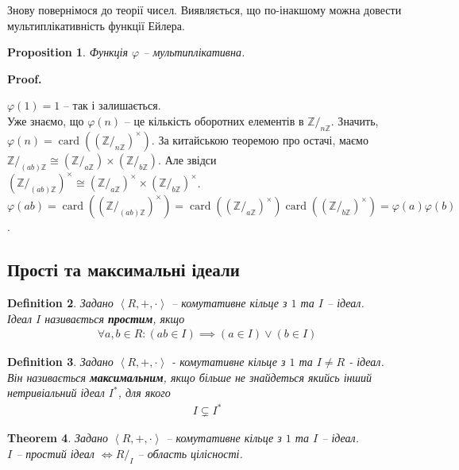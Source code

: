 \documentclass[a4paper, 10pt]{article}
\makeatletter
\theoremstyle{theoremdd}
\newtheorem{theorem}{Theorem}[subsection]
\theoremstyle{theoremdd}
\newtheorem{definition}[theorem]{Definition}
\theoremstyle{theoremdd}
\theoremstyle{theoremdd}
\theoremstyle{theoremdd}
\theoremstyle{theoremdd}
\theoremstyle{theoremdd}
\theoremstyle{theoremdd}
\theoremstyle{theoremdd}
\newtheorem{proposition}[theorem]{Proposition}
\theoremstyle{theoremdd}
\theoremstyle{theoremdd}
\theoremstyle{theoremdd}
\theoremstyle{theoremdd}
\theoremstyle{theoremdd}
\theoremstyle{theoremdd}
\renewenvironment{proof}[1][Proof.\\]{\par
\pushQED{\hfill \qed}%
\normalfont \topsep6\p@\@plus6\p@\relax
\trivlist
\item\relax
{\bfseries
#1\@addpunct{.}}\hspace\labelsep\ignorespaces
}{%
\popQED\endtrivlist\@endpefalse
}
\DeclareMathOperator{\card}{card}
\makeatother
\begin{document}
Знову повернімося до теорії чисел. Виявляється, що по-інакшому можна довести мультиплікативність функції Ейлера.

\begin{proposition}
Функція $\varphi$ -- мультиплікативна.
\end{proposition}

\begin{proof}
$\varphi(1) = 1$ -- так і залишається.\\
Уже знаємо, що $\varphi(n)$ -- це кількість оборотних елементів в $\mathbb{Z}/_{n \mathbb{Z}}$. Значить, $\varphi(n) = \card ((\mathbb{Z}/_{n \mathbb{Z}})^\times)$. За китайською теоремою про остачі, маємо $\mathbb{Z}/_{(ab) \mathbb{Z}} \cong (\mathbb{Z}/_{a \mathbb{Z}}) \times (\mathbb{Z}/_{b \mathbb{Z}})$. Але звідси $(\mathbb{Z}/_{(ab) \mathbb{Z}})^\times \cong (\mathbb{Z}/_{a \mathbb{Z}})^\times \times (\mathbb{Z}/_{b \mathbb{Z}})^\times$.\\
$\varphi(ab) = \card((\mathbb{Z}/_{(ab)\mathbb{Z}})^\times) = \card((\mathbb{Z}/_{a \mathbb{Z}})^\times) \card((\mathbb{Z}/_{b \mathbb{Z}})^\times) = \varphi(a) \varphi(b)$.
\end{proof}

\subsection{Прості та максимальні ідеали}
\begin{definition}
Задано $\left<R,+,\cdot \right>$ -- комутативне кільце з $1$ та $I$ -- ідеал.\\
Ідеал $I$ називається \textbf{простим}, якщо
\begin{align*}
\forall a,b \in R: (ab \in I) \implies (a \in I) \vee (b \in I)
\end{align*}
\end{definition}

\begin{definition}
Задано $\left<R,+,\cdot \right>$ - комутативне кільце з $1$ та $I \neq R$ - ідеал.\\
Він називається \textbf{максимальним}, якщо більше не знайдеться якийсь інший нетривіальний ідеал $I^*$, для якого
\begin{align*}
I \subsetneq I^*
\end{align*}
\end{definition}

\begin{theorem}
Задано $\left<R,+,\cdot \right>$ -- комутативне кільце з $1$ та $I$ -- ідеал.\\
$I$ -- простий ідеал $\iff R/_I$ -- область цілісності.
\end{theorem}
\end{document}
